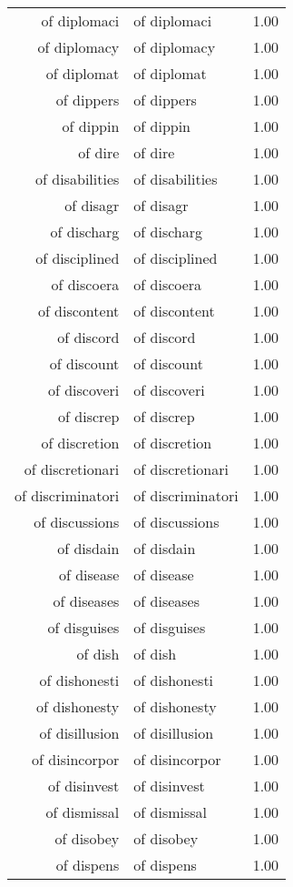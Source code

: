 \begin{table}[ht]
\begin{tabular}{rlr}
  of diplomaci & of diplomaci & 1.00 \\ 
  of diplomacy & of diplomacy & 1.00 \\ 
  of diplomat & of diplomat & 1.00 \\ 
  of dippers & of dippers & 1.00 \\ 
  of dippin & of dippin & 1.00 \\ 
  of dire & of dire & 1.00 \\ 
  of disabilities & of disabilities & 1.00 \\ 
  of disagr & of disagr & 1.00 \\ 
  of discharg & of discharg & 1.00 \\ 
  of disciplined & of disciplined & 1.00 \\ 
  of discoera & of discoera & 1.00 \\ 
  of discontent & of discontent & 1.00 \\ 
  of discord & of discord & 1.00 \\ 
  of discount & of discount & 1.00 \\ 
  of discoveri & of discoveri & 1.00 \\ 
  of discrep & of discrep & 1.00 \\ 
  of discretion & of discretion & 1.00 \\ 
  of discretionari & of discretionari & 1.00 \\ 
  of discriminatori & of discriminatori & 1.00 \\ 
  of discussions & of discussions & 1.00 \\ 
  of disdain & of disdain & 1.00 \\ 
  of disease & of disease & 1.00 \\ 
  of diseases & of diseases & 1.00 \\ 
  of disguises & of disguises & 1.00 \\ 
  of dish & of dish & 1.00 \\ 
  of dishonesti & of dishonesti & 1.00 \\ 
  of dishonesty & of dishonesty & 1.00 \\ 
  of disillusion & of disillusion & 1.00 \\ 
  of disincorpor & of disincorpor & 1.00 \\ 
  of disinvest & of disinvest & 1.00 \\ 
  of dismissal & of dismissal & 1.00 \\ 
  of disobey & of disobey & 1.00 \\ 
  of dispens & of dispens & 1.00 \\ 

\end{tabular}
\end{table}
